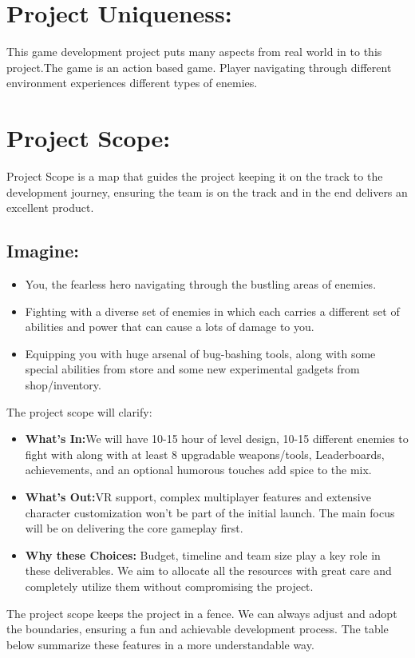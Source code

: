 \section{Project Uniqueness:}
This game development project puts many aspects from real world in to this project.The game is an action based game.
Player navigating through different environment experiences different types of enemies.
\section{Project Scope:}
Project Scope is a map that guides the project keeping it on the track to the development journey, ensuring the team is on the track and in the end delivers an excellent product.
\subsection{Imagine:}
\begin{itemize}
\item 	You, the fearless hero navigating through the bustling areas of enemies.
\item Fighting with a diverse set of enemies in which each carries a  different set of abilities and power that can cause a lots of damage to you.
\item 	Equipping you with huge arsenal of bug-bashing tools, along with some special abilities from store and some new experimental gadgets from shop/inventory.
\end{itemize}
The project scope will clarify:
\begin{itemize}
	\item \textbf{What’s In:}We will have 10-15 hour of level design, 10-15 different enemies to fight with along with at least 8 upgradable  weapons/tools, Leaderboards, achievements, and an optional humorous touches add spice to the mix.
	\item \textbf{What's Out:}VR support, complex multiplayer features and extensive character customization won’t be part of the initial launch. The main focus will be on delivering the core gameplay first.
	\item \textbf{Why these Choices:} Budget, timeline and team size play a key role in these deliverables. We aim to allocate all the resources with great care and completely utilize them without compromising the project.
\end{itemize}
The project scope keeps the project in a fence. We can always adjust and adopt the boundaries, ensuring a fun and achievable development process. The table below summarize these features in a more understandable way.

